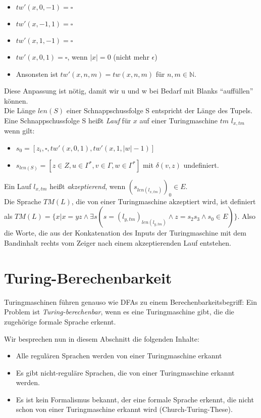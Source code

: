 \begin{itemize}
    \item $tw'(x, 0, -1) = \square$
    \item $tw'(x, -1, 1) = \square$
    \item $tw'(x, 1, -1) = \square$
    \item $tw'(x, 0, 1) = \square$, wenn $|x| = 0$ (nicht mehr $\epsilon$)
    \item Ansonsten ist $tw'(x, n, m) = tw(x, n, m)$ für $n, m \in \mathbb{N}$.
\end{itemize}
Diese Anpassung ist nötig, damit wir u und w bei Bedarf mit Blanks ``auffüllen'' können.
\\

\noindent
Die Länge $len(S)$ einer Schnappschussfolge S entspricht der Länge des Tupels.
\\

\noindent
Eine Schnappschussfolge S heißt
\emph{Lauf} für $x$ auf einer Turingmaschine $tm$ $l_{x, tm}$
wenn gilt:
\begin{itemize}
    \item $s_0 = [z_i, \square, tw'(x,0,1), tw'(x,1,|w|-1)]$
    \item $s_{len(S)} = [z \in Z, u \in \Gamma^*, v \in \Gamma, w \in \Gamma^*]$
        mit $\delta(v, z)$ undefiniert.
\end{itemize}

\noindent
Ein Lauf $l_{x, tm}$ heißt \emph{akzeptierend},
wenn $(s_{len(l_{x, tm})})_0 \in E$.
\\

\noindent
Die Sprache $TM(L)$, die von einer Turingmaschine akzeptiert wird, ist definiert als
$TM(L) =
\{x|
    x = yz
    \wedge
        \exists s(
            s = (l_{y,tm})_{len(l_{y,tm})}
            \wedge z = s_2s_3
            \wedge s_0 \in E
        )
\}$.
Also die Worte,
die aus der Konkatenation des Inputs der Turingmaschine
mit dem Bandinhalt rechts vom Zeiger nach einem akzeptierenden Lauf entstehen.

\section{Turing-Berechenbarkeit}

Turingmaschinen führen genauso wie DFAs zu einem Berechenbarkeitsbegriff:
Ein Problem ist \emph{Turing-berechenbar},
wenn es eine Turingmaschine gibt,
die die zugehörige formale Sprache erkennt.

Wir besprechen nun in diesem Abschnitt die folgenden Inhalte:
\begin{itemize}
    \item Alle regulären Sprachen werden von einer Turingmaschine erkannt
    \item Es gibt nicht-reguläre Sprachen, die von einer Turingmaschine erkannt werden.
    \item Es ist kein Formalismus bekannt, der eine formale Sprache erkennt,
        die nicht schon von einer Turingmaschine erkannt wird (Church-Turing-These).
\end{itemize}

